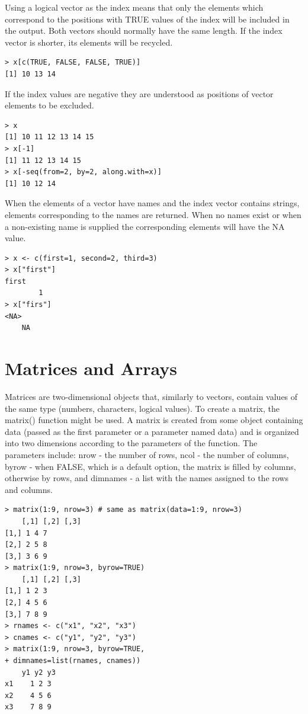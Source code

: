 \documentclass[11pt,openany,executivepaper]{book}
\begin{document}
Using a logical vector as the index means that only the elements which correspond to the positions with TRUE values of the index will be included in the output. Both vectors should normally have the same length. If the index vector is shorter, its elements will be recycled.


\begin{verbatim}
> x[c(TRUE, FALSE, FALSE, TRUE)]
[1] 10 13 14
\end{verbatim}

If the index values are negative they are understood as positions of vector elements to be excluded.

\begin{verbatim}
> x
[1] 10 11 12 13 14 15
> x[-1]
[1] 11 12 13 14 15
> x[-seq(from=2, by=2, along.with=x)]
[1] 10 12 14
\end{verbatim}

When the elements of a vector have names and the index vector contains strings, elements corresponding to the names are returned. When no names exist or when a non-existing name is supplied the corresponding elements will have the NA value.

\begin{verbatim}
> x <- c(first=1, second=2, third=3)
> x["first"]
first
        1
> x["firs"]
<NA>
    NA
\end{verbatim}

\section{Matrices and Arrays}
Matrices are two-dimensional objects that, similarly to vectors, contain values of the same type (numbers, characters, logical values). To create a matrix, the matrix() function might be used. A matrix is created from some object containing data (passed as the first parameter or a parameter named data) and is organized into two dimensions according to the parameters of the function. The\\
parameters include: nrow - the number of rows, ncol - the number of columns, byrow - when FALSE, which is a default option, the matrix is filled by columns, otherwise by rows, and dimnames - a list with the names assigned to the rows and columns.

\begin{verbatim}
> matrix(1:9, nrow=3) # same as matrix(data=1:9, nrow=3)
    [,1] [,2] [,3]
[1,] 1 4 7
[2,] 2 5 8
[3,] 3 6 9
> matrix(1:9, nrow=3, byrow=TRUE)
    [,1] [,2] [,3]
[1,] 1 2 3
[2,] 4 5 6
[3,] 7 8 9
> rnames <- c("x1", "x2", "x3")
> cnames <- c("y1", "y2", "y3")
> matrix(1:9, nrow=3, byrow=TRUE,
+ dimnames=list(rnames, cnames))
    y1 y2 y3
x1    1 2 3
x2    4 5 6
x3    7 8 9
\end{verbatim}
\end{document}

